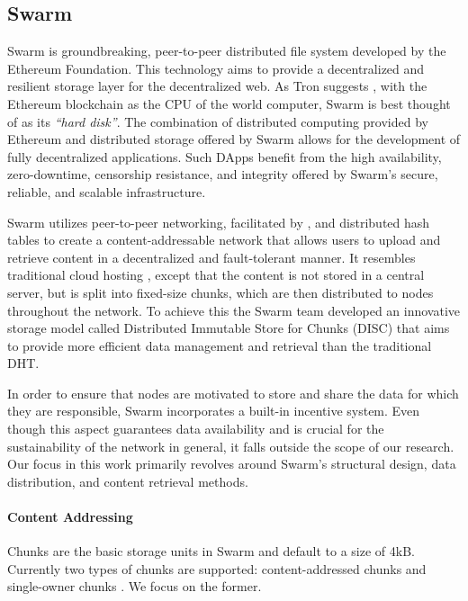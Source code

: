 \subsection{Swarm}\label{subsection:swarm}
Swarm is  groundbreaking, peer-to-peer distributed file system developed by the Ethereum Foundation. This technology aims to provide a decentralized and resilient storage layer for the decentralized web. As Tron suggests \citep{tron_2021}, with the Ethereum blockchain as the CPU of the world computer, Swarm is best thought of as its \emph{``hard disk''}. The combination of distributed computing provided by Ethereum and distributed storage offered by Swarm allows for the development of fully decentralized applications. Such DApps benefit from the high availability, zero-downtime, censorship resistance, and integrity offered by Swarm's secure, reliable, and scalable infrastructure.

Swarm utilizes peer-to-peer networking,  facilitated by , and distributed hash tables to create a content-addressable network that allows users to upload and retrieve content in a decentralized and fault-tolerant manner. It resembles traditional cloud hosting \citep{swarmwiki_2019}, except that the content is not stored in a central server, but is split into fixed-size chunks, which are then distributed to nodes throughout the network. To achieve this the Swarm team developed an innovative storage model called Distributed Immutable Store for Chunks (DISC) \citep{swarm_team_2021} that aims to provide more efficient data management and retrieval than the traditional DHT.

In order to ensure that nodes are motivated to store and share the data for which they are responsible, Swarm incorporates a built-in incentive system. Even though this aspect guarantees data availability and is crucial for the sustainability of the network in general, it falls outside the scope of our research. Our focus in this work primarily revolves around Swarm's structural design, data distribution, and content retrieval methods.

\paragraph{Content Addressing}\label{par:chunks_swarm}

Chunks are the basic storage units in Swarm and default to a size of 4kB. Currently two types of chunks are supported: content-addressed chunks and single-owner chunks \citep{swarm_team_2021}. We focus on the former.

